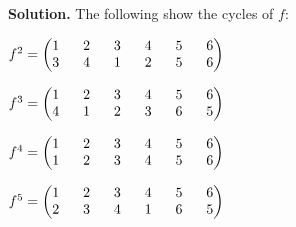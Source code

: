 \documentclass[11pt]{article}
\begin{document}
\begin{enumerate}
	{\bfseries Solution.} The following show the cycles of $f$:
	
	$f^2 = \begin{pmatrix}
		1 \hspace{6mm} 2 \hspace{6mm} 3 \hspace{6mm} 4 \hspace{6mm} 5 \hspace{6mm} 6 \\
		3 \hspace{6mm} 4 \hspace{6mm} 1 \hspace{6mm} 2 \hspace{6mm} 5 \hspace{6mm} 6
	\end{pmatrix}$
	
	$f^3 = \begin{pmatrix}
		1 \hspace{6mm} 2 \hspace{6mm} 3 \hspace{6mm} 4 \hspace{6mm} 5 \hspace{6mm} 6 \\
		4 \hspace{6mm} 1 \hspace{6mm} 2 \hspace{6mm} 3 \hspace{6mm} 6 \hspace{6mm} 5
	\end{pmatrix}$
	
	$f^4 = \begin{pmatrix}
		1 \hspace{6mm} 2 \hspace{6mm} 3 \hspace{6mm} 4 \hspace{6mm} 5 \hspace{6mm} 6 \\
		1 \hspace{6mm} 2 \hspace{6mm} 3 \hspace{6mm} 4 \hspace{6mm} 5 \hspace{6mm} 6
	\end{pmatrix}$
	
	$f^5 = \begin{pmatrix}
		1 \hspace{6mm} 2 \hspace{6mm} 3 \hspace{6mm} 4 \hspace{6mm} 5 \hspace{6mm} 6 \\
		2 \hspace{6mm} 3 \hspace{6mm} 4 \hspace{6mm} 1 \hspace{6mm} 6 \hspace{6mm} 5
	\end{pmatrix}$

\end{enumerate}
\end{document}
